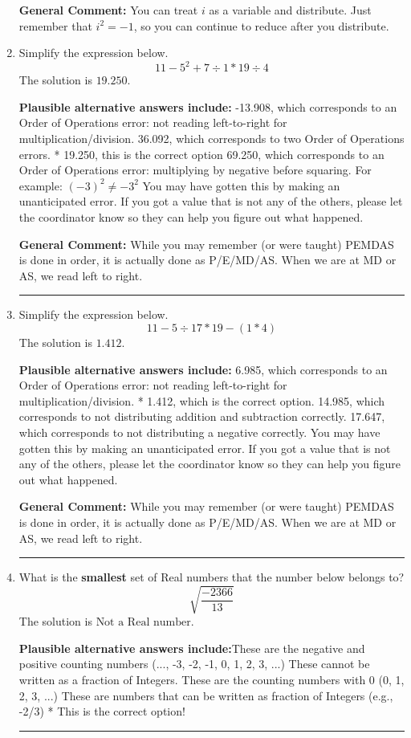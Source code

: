 \documentclass{extbook}[14pt]
\newcommand{\litem}[1]{\item #1

\rule{\textwidth}{0.4pt}}
\begin{document}
\begin{enumerate}
{\textbf{General Comment:} You can treat $i$ as a variable and distribute. Just remember that $i^2=-1$, so you can continue to reduce after you distribute.
}
\litem{
Simplify the expression below.
\[ 11 - 5^2 + 7 \div 1 * 19 \div 4 \]The solution is \( 19.250 \).\begin{enumerate}[label=\Alph*.]
\textbf{Plausible alternative answers include:} -13.908, which corresponds to an Order of Operations error: not reading left-to-right for multiplication/division.
 36.092, which corresponds to two Order of Operations errors.
* 19.250, this is the correct option
 69.250, which corresponds to an Order of Operations error: multiplying by negative before squaring. For example: $(-3)^2 \neq -3^2$
 You may have gotten this by making an unanticipated error. If you got a value that is not any of the others, please let the coordinator know so they can help you figure out what happened.
\end{enumerate}

\textbf{General Comment:} While you may remember (or were taught) PEMDAS is done in order, it is actually done as P/E/MD/AS. When we are at MD or AS, we read left to right.
}
\litem{
Simplify the expression below.
\[ 11 - 5 \div 17 * 19 - (1 * 4) \]The solution is \( 1.412 \).\begin{enumerate}[label=\Alph*.]
\textbf{Plausible alternative answers include:} 6.985, which corresponds to an Order of Operations error: not reading left-to-right for multiplication/division.
* 1.412, which is the correct option.
 14.985, which corresponds to not distributing addition and subtraction correctly.
 17.647, which corresponds to not distributing a negative correctly.
 You may have gotten this by making an unanticipated error. If you got a value that is not any of the others, please let the coordinator know so they can help you figure out what happened.
\end{enumerate}

\textbf{General Comment:} While you may remember (or were taught) PEMDAS is done in order, it is actually done as P/E/MD/AS. When we are at MD or AS, we read left to right.
}
\litem{
What is the \textbf{smallest} set of Real numbers that the number below belongs to?
\[ \sqrt{\frac{-2366}{13}} \]The solution is \( \text{Not a Real number} \).\begin{enumerate}[label=\Alph*.]
\textbf{Plausible alternative answers include:}These are the negative and positive counting numbers (..., -3, -2, -1, 0, 1, 2, 3, ...)
These cannot be written as a fraction of Integers.
These are the counting numbers with 0 (0, 1, 2, 3, ...)
These are numbers that can be written as fraction of Integers (e.g., -2/3)
* This is the correct option!
\end{enumerate}

}
\end{enumerate}
\end{document}
